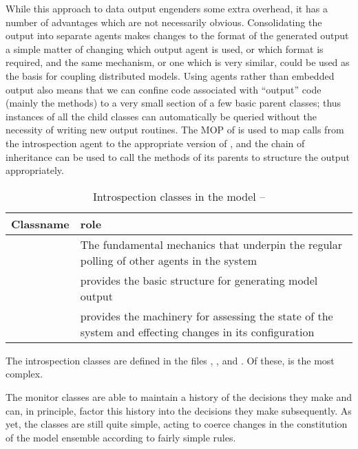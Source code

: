 While this approach to data output engenders some extra overhead, it
has a number of advantages which are not necessarily
obvious. Consolidating the output into separate agents makes changes
to the format of the generated output a simple matter of changing
which output agent is used, or which format is required, and the same
mechanism, or one which is very similar, could be used as the basis
for coupling distributed models.  Using \mlogger agents rather than
embedded output also means that we can confine code associated with
``output'' code (mainly the  methods) to a very small
section of a few basic parent classes; thus instances of all the child
classes can automatically be queried without the necessity of writing
new output routines.  The MOP of \SCLOS is used to map calls from the
introspection agent to the appropriate version of ,
and the chain of inheritance can be used to call the 
methods of its parents to structure the output appropriately.

\begin{table}[H]
\begin{center}
  \caption{Introspection classes in the model -- \label{classtable2}}
  \begin{tabular}{l L{7cm}}
    \toprule
    \textbf{Classname} & \textbf{role} \\
    \midrule
     & The fundamental mechanics that
      underpin the regular polling of other agents in the system\\
     & {provides the basic structure for generating model output}\\
     & {provides the machinery for assessing the state
      of the system and effecting changes in its configuration}\\
    \bottomrule
  \end{tabular}
\end{center}
\end{table}
The introspection classes are defined in the files
, , and
.  Of these,  is the
most complex.

The monitor classes are able to maintain a history of the decisions
they make and can, in principle, factor this history into the
decisions they make subsequently.  As yet, the \mmonitor classes are
still quite simple, acting to coerce changes in the constitution of
the model ensemble according to fairly simple rules.




